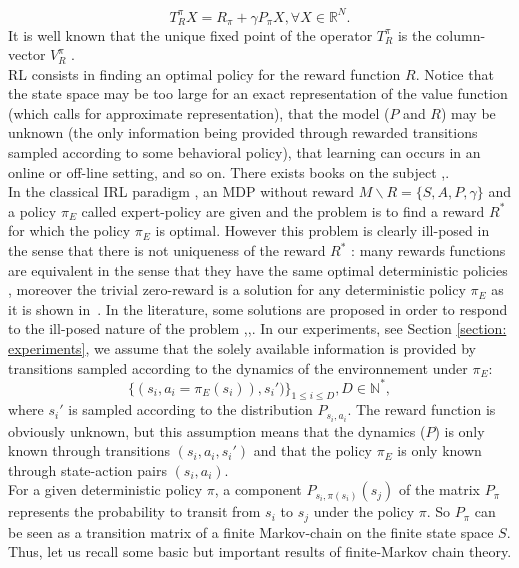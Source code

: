 \documentclass{article} %
\newcommand{\0}{\mathbf{0}}
\newcommand{\1}{\mathbf{1}}
\begin{document}
\begin{equation}
T^\pi_RX=R_\pi+\gamma P_\pi X , \forall X\in \mathbb{R}^N.
\end{equation}
It is well known that the unique fixed point of the operator $T^\pi_R$ is the column-vector $V^\pi_R$ \cite{puterman1994markov}.\\
RL consists in finding an optimal policy for the reward function $R$. Notice that the state space may be too large for an exact representation of the value function (which calls for approximate
representation), that the model ($P$ and $R$) may be unknown (the only information being provided through rewarded transitions sampled according
to some behavioral policy), that learning can occurs in an online or off-line setting, and so on. There exists books on the subject \cite{bertsekas2001dynamic},\cite{sutton1998reinforcement}.\\
In the classical IRL paradigm \cite{ng2000algorithms}, an MDP without reward $M\backslash R =\{S,A,P,\gamma\}$ and a policy $\pi_E$ called expert-policy are given and the problem is to find
a reward $R^*$ for which the policy $\pi_E$ is optimal. However this problem is clearly ill-posed in the sense that there is not uniqueness of the reward $R^*$ : many rewards functions are equivalent in the sense that they have the same optimal deterministic policies \cite{ng1999policyreward}, moreover the trivial zero-reward is a solution for any deterministic policy $\pi_E$ as it is shown in~\cite{ng2000algorithms}. In the literature, some solutions are proposed in order to respond to the ill-posed nature of the problem \cite{ng2000algorithms},\cite{ziebart2008maximum},\cite{boularias2011relative}.
In our experiments, see Section \ref{section: experiments}, we assume that the solely available information is provided by transitions sampled according to the dynamics of the environnement under $\pi_E$:
\begin{equation}
\{(s_i,a_i=\pi_E(s_i)),s_i')\}_{1\leq i \leq D}, D\in\mathbb{N}^*,
\end{equation}
where $s_i'$ is sampled according to the distribution $P_{s_i,a_i}$.
The reward function is obviously unknown, but this assumption means that the dynamics ($P$) is only known through transitions $(s_i, a_i, s_i')$ and that the
policy $\pi_E$ is only known through state-action pairs $(s_i, a_i)$.\\
For a given deterministic policy $\pi$, a component $P_{s_i,\pi(s_i)}(s_j)$ of the matrix $P_\pi$ represents the probability to transit from $s_i$ to $s_j$ under the policy $\pi$. So $P_\pi$ can be seen as a transition matrix of a finite Markov-chain on the finite state space $S$. Thus, let us recall some basic but important results of finite-Markov chain theory.
\end{document}
